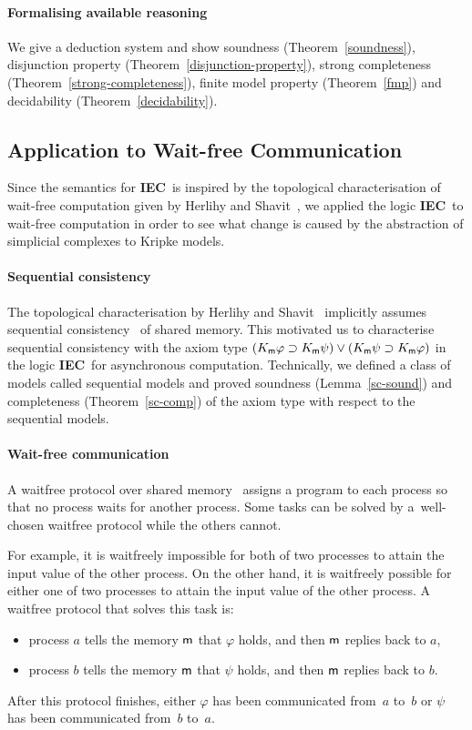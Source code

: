 \documentclass[doctor]{iscs-thesis}
\newcommand{\iec}{{\rm {\textbf{IEC}}}}
\newcommand{\memory}{{\sf m}}
\begin{document}
\paragraph{Formalising available reasoning}
We give a deduction system and show
soundness (Theorem~\ref{soundness}), disjunction property (Theorem~\ref{disjunction-property}),
strong completeness
(Theorem~\ref{strong-completeness}), finite model property
 (Theorem~\ref{fmp}) and decidability (Theorem~\ref{decidability}).

\subsection{Application to Wait-free Communication}

Since the semantics for \iec\, is inspired by the topological characterisation of wait-free
computation given by Herlihy and Shavit~\cite{herlihy1999topological},
we applied the logic \iec\, to wait-free computation in order to see
what change is caused by the abstraction of simplicial complexes to Kripke models.

\paragraph{Sequential consistency}
The topological characterisation by Herlihy and Shavit~\cite{herlihy1999topological}
implicitly assumes sequential consistency~\cite{lamport1979make} of shared memory.  
This motivated us to characterise sequential consistency with the axiom type
$(K_\memory \varphi\supset K_\memory \psi)\vee (K_\memory
       \psi\supset K_\memory \varphi)$
in the logic \iec\, for asynchronous computation.
Technically, we defined a class of models called sequential models
and proved soundness
(Lemma~\ref{sc-sound}) and completeness
 (Theorem~\ref{sc-comp}) of the axiom type with respect to the sequential models.

\paragraph{Wait-free communication}
A waitfree protocol over shared memory~\cite{herlihy1991wait}
 assigns a program to each process so that no process waits for another process.
Some tasks can be solved by a~well-chosen waitfree protocol while the others cannot.

For example, 
 it is waitfreely impossible for both of two processes to attain the input value of the other
 process.
 On the other hand, it is waitfreely possible for
 either one of two processes to attain the input value of the other process.
 A waitfree protocol that solves this task is:
\begin{itemize}
 \item process $a$ tells the memory $\memory$ that $\varphi$ holds, and then $\memory$ replies back to $a$,
 \item process $b$ tells the memory $\memory$ that $\psi$    holds, and then $\memory$ replies back to $b$.
\end{itemize}
After this protocol finishes,
  either $\varphi$ has been communicated from~$a$ to~$b$ 
or $\psi$ has
been communicated from~$b$ to~$a$.
\end{document}
